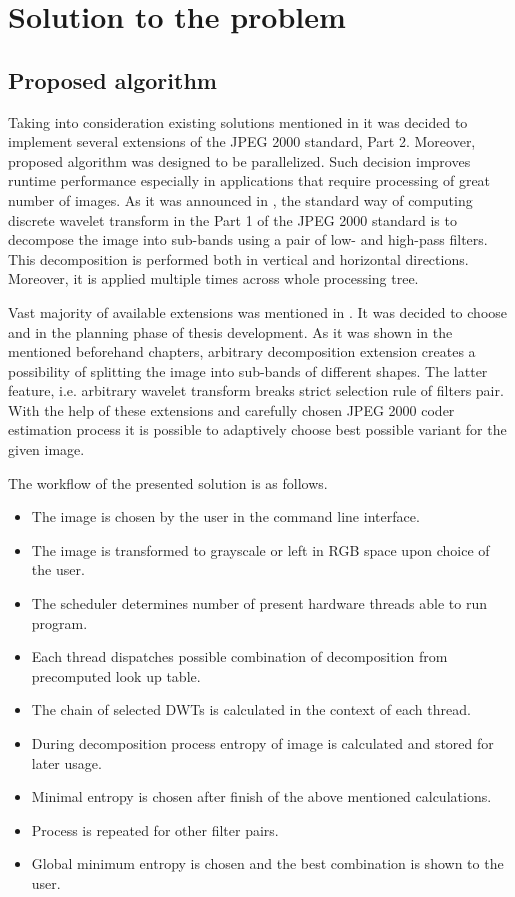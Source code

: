 \section{Solution to the problem}

\subsection{Proposed algorithm}

Taking into consideration existing solutions mentioned in  it was decided to
implement several extensions of the JPEG 2000 standard, Part 2. Moreover, proposed algorithm
was designed to be parallelized. Such decision improves runtime performance especially in applications
that require processing of great number of images. As it was announced in , the standard
way of computing discrete wavelet transform in the Part 1 of the JPEG 2000 standard is to decompose the
image into sub-bands using a pair of low- and high-pass filters. This decomposition is performed both in
vertical and horizontal directions. Moreover, it is applied multiple times across whole processing tree.

Vast majority of available extensions was mentioned in . It was decided to choose
 and  in the planning phase of
thesis development. As it was shown in the mentioned beforehand chapters, arbitrary decomposition
extension creates a possibility of splitting the image into sub-bands of different shapes. The latter feature,
i.e. arbitrary wavelet transform breaks strict selection rule of filters pair. With the help of these
extensions and carefully chosen JPEG 2000 coder estimation process it is possible to adaptively choose
best possible variant for the given image.

The workflow of the presented solution is as follows.

\begin{itemize}
    \item The image is chosen by the user in the command line interface.
    \item The image is transformed to grayscale or left in RGB space upon choice of the user.
    \item The scheduler determines number of present hardware threads able to run program.
    \item Each thread dispatches possible combination of decomposition from precomputed look up table.
    \item The chain of selected DWTs is calculated in the context of each thread.
    \item During decomposition process entropy of image is calculated and stored for later usage.
    \item Minimal entropy is chosen after finish of the above mentioned calculations.
    \item Process is repeated for other filter pairs.
    \item Global minimum entropy is chosen and the best combination is shown to the user.
\end{itemize}

